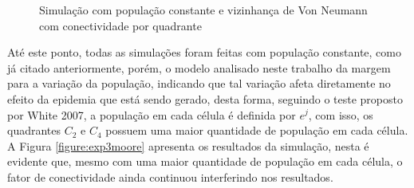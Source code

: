 \documentclass[a4paper,12pt]{article}
\begin{document}
\begin{figure}[!ht]
\qquad
{}
\qquad
{}
\caption{Simulação com população constante e vizinhança de Von Neumann com conectividade por quadrante}
\label{figure:exp2vonneumann}
\end{figure}

Até este ponto, todas as simulações foram feitas com população constante, como já citado anteriormente, porém, o modelo analisado neste trabalho da margem para a variação da população, indicando que tal variação afeta diretamente no efeito da epidemia que está sendo gerado, desta forma, seguindo o teste proposto por White 2007\cite{White2007}, a população em cada célula é definida por $e^j$, com isso, os quadrantes $C_2$ e $C_4$ possuem uma maior quantidade de população em cada célula. A Figura \ref{figure:exp3moore} apresenta os resultados da simulação, nesta é evidente que, mesmo com uma maior quantidade de população em cada célula, o fator de conectividade ainda continuou interferindo nos resultados. 
\end{document}
